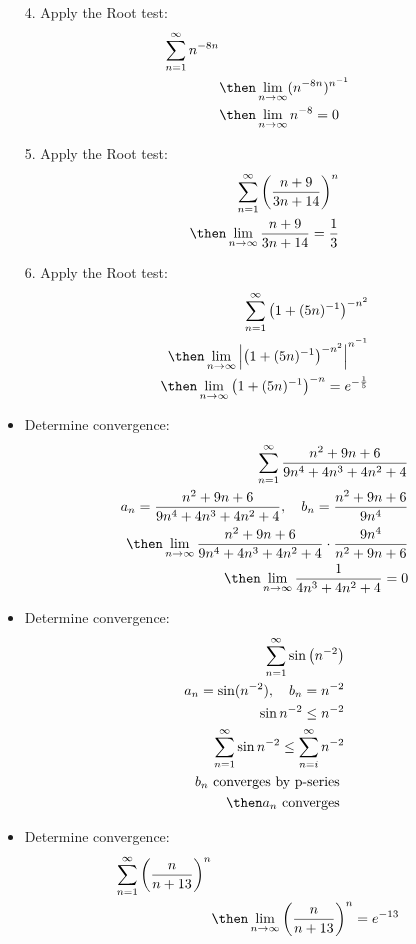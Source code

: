 \begin{itemize}
  \newpage

  \item[4.] Apply the Root test:
    \begin{align*}
      \sum_{n=1}^{\infty} n^{-8n} \\
      &\then \lim_{n \to \infty} (n^{-8n})^{n^{-1}} \\
      &\then \lim_{n \to \infty} n^{-8} = 0
    \end{align*}

  \item[5.] Apply the Root test:
    \begin{align*}
      \sum_{n=1}^{\infty} \left( \frac{n+9}{3n+14} \right)^n \\
      \then \lim_{n \to \infty}\frac{n+9}{3n+14} = \frac{1}{3}
    \end{align*}


  \item[6.] Apply the Root test:
    \begin{align*}
      \sum_{n=1}^{\infty} \left(1+(5n)^{-1}\right)^{-n^2}\\
      \then \lim_{n \to \infty} \left|  \left(1+(5n)^{-1}\right)^{-n^2} \right|^{n^{-1}}  \\
      \then  \lim_{n \to \infty} \left(1+(5n)^{-1}\right)^{-n} = e^{-\frac{1}{5}}
    \end{align*}

  \item Determine convergence:
    \begin{align*}
      \sum_{n=1}^{\infty} \frac{n^2+9n+6}{9n^4 + 4n^3 + 4n^2 + 4} \\
      a_n = \frac{n^2+9n+6}{9n^4 + 4n^3 + 4n^2 + 4}, \quad b_n = \frac{n^2+9n+6}{9n^4} \\
      \then \lim_{n \to \infty}\frac{n^2+9n+6}{9n^4 + 4n^3 + 4n^2 + 4} \cdot \frac{9n^4}{n^2+9n+6} \\
      \then \lim_{n \to \infty} \frac{1}{4n^3+4n^2+4} =0 \\
    \end{align*}

  \item Determine convergence:
    \begin{align*}
      \sum_{n=1}^{\infty} \sin \left( n^{-2} \right) \\
      a_n = \sin (n^{-2}), \quad b_n = n^{-2} \\
      \sin n^{-2} \leq n^{-2} \\
      \sum_{n=1}^{\infty}\sin n^{-2} \leq  \sum_{n=i}^{\infty}n^{-2} \\
      b_n ~\text{converges by p-series}~\\
      \then a_n ~\text{converges}~
    \end{align*}

  \item Determine convergence:
    \begin{align*}
      \sum_{n=1}^{\infty} \left( \frac{n}{n+13} \right) ^n \\
      &\then \lim_{n \to \infty} \left( \frac{n}{n+13} \right)^n = e^{-13}
    \end{align*}

\end{itemize}
